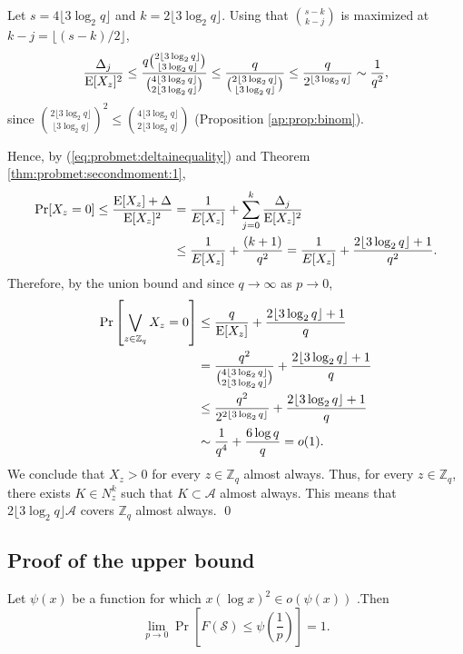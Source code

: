 Let $s = 4\lfloor 3 \log_2 q \rfloor$ and $k = 2\lfloor 3 \log_2 q \rfloor$. Using that $\binom{s - k}{k - j}$ is maximized at $k - j = \lfloor (s - k) / 2\rfloor$,
\begin{align*}
\frac{\Delta_j}{\mathrm{E}[X_z]^2} \leq \frac{q \binom{2\lfloor 3 \log_2 q\rfloor}{\lfloor 3 \log_2 q \rfloor}}{\binom{4\lfloor 3\log_2 q \rfloor}{2\lfloor 3\log_2 q \rfloor}} \leq \frac{q}{\binom{2\lfloor 3 \log_2 q \rfloor }{ \lfloor 3 \log_2 q \rfloor}} \leq \frac{q}{2^{\lfloor 3 \log_2 q \rfloor}} \sim \frac{1}{q^2},
\end{align*}
since \(\binom{2\lfloor 3\log_2 q \rfloor}{\lfloor 3 \log_2 q \rfloor}^2 \leq \binom{4\lfloor 3 \log_2 q \rfloor }{2\lfloor 3 \log_2 q \rfloor}\) (Proposition \ref{ap:prop:binom}).   \par
Hence, by (\ref{eq:probmet:deltainequality}) and Theorem \ref{thm:probmet:secondmoment:1},
\begin{align*}
\mathrm{Pr}[X_z = 0] \leq \frac{\mathrm{E}[X_z] + \Delta}{\mathrm{E}[X_z]^2} &= \frac{1}{E[X_z]} + \sum_{j = 0}^k \frac{\Delta_j}{\mathrm{E}[X_z]^2} \\
&\leq \frac{1}{E[X_z]} + \frac{(k + 1)}{q^2} = \frac{1}{E[X_z]} + \frac{2\lfloor 3 \log_2 q\rfloor + 1}{q^2}.
\end{align*}
Therefore, by the union bound and since $q \to \infty$ as $p \to 0$,
\begin{align}
\mathrm{Pr}\left[\bigvee_{z \in \mathbb{Z}_q} X_z = 0\right] &\leq \frac{q}{\mathrm{E}[X_z]} + \frac{2\lfloor 3 \log_2 q\rfloor + 1}{q}\\
 &= \frac{q^2}{\binom{4\lfloor 3\log_2 q \rfloor}{2\lfloor 3\log_2 q \rfloor}} + \frac{2\lfloor 3 \log_2 q\rfloor + 1}{q} \\
 &\leq \frac{q^2}{2^{2\lfloor 3\log_2 q \rfloor}} + \frac{2\lfloor 3 \log_2 q\rfloor + 1}{q} \\
 &\sim \frac{1}{q^4} + \frac{6\log q}{q}= o(1).\label{eq:lemma:prob}
\end{align}
We conclude that $X_z > 0$ for every $z \in \mathbb{Z}_q$ almost always. Thus, for every $z \in \mathbb{Z}_q$, there exists $K \in N_z^k$ such that $K \subset \mathcal{A}$ almost always. This means that $2\lfloor 3 \log_2 q\rfloor \mathcal{A}$ covers $\mathbb{Z}_q$ almost always. \qed

\subsection{Proof of the upper bound} 
\begin{lemma}\label{lem:upperbound}
    Let $\psi(x)$ be a function for which $x(\log x)^2 \in o(\psi(x))$ .Then
    \[\lim_{p \to 0}\Pr\left[F(\mathcal{S}) \leq \psi\left(\frac{1}{p}\right)\right] = 1.\] 
\end{lemma}

